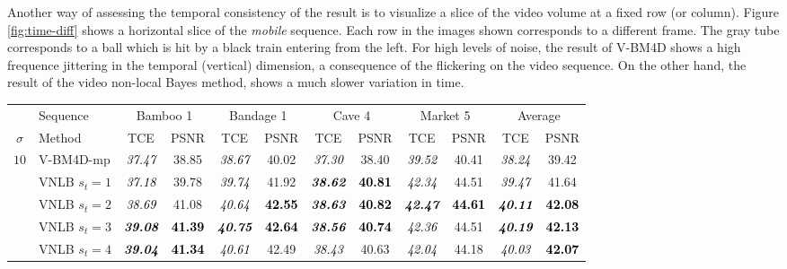 \documentclass[10pt, a4paper]{article}
\newcommand{\best}[1]{#1}
\newcommand{\bsic}[1]{\textcolor{black}{\textit{#1}}}
\newcommand{\Bsic}[1]{\textcolor{black}{\textbf{\textit{#1}}}}
\newcommand{\Best}[1]{\textbf{\textcolor{black}{#1}}}
\begin{document}
Another way of assessing the temporal consistency of the result is to visualize a 
slice of the video volume at a fixed row (or column). Figure \ref{fig:time-diff} shows
a horizontal slice of the \emph{mobile} sequence. Each row in the images shown corresponds
to a different frame. The gray tube corresponds to a ball which is hit by a
black train entering from the left. For high levels of noise, the result of V-BM4D
shows a high frequence jittering in the temporal (vertical) dimension, a consequence
of the flickering on the video sequence. On the other hand, the result of the
video non-local Bayes method, shows a much slower variation in time.


\begin{table}[htp!]
	\begin{center}
		{\small
		\renewcommand{\tabcolsep}{1.6mm}
		\renewcommand{\arraystretch}{1.3}
		\begin{tabular}{ c | l |c c | c c | c c | c c | c c}
			\hline
			\rule{0pt}{10pt}         & Sequence          &\multicolumn{2}{c|}{Bamboo 1}&\multicolumn{2}{c|}{Bandage 1}&\multicolumn{2}{c|}{Cave 4} &\multicolumn{2}{c|}{Market 5}& \multicolumn{2}{c}{Average} \\
			\rule{0pt}{10pt}$\sigma$ & Method            & TCE          & PSNR         & TCE          & PSNR         & TCE          & PSNR         & TCE          & PSNR         & TCE          & PSNR         \\\hline
			\multirow{1}{*}{$10$}
			                      & V-BM4D-mp            & \bsic{37.47} &       38.85  & \bsic{38.67} &       40.02  & \bsic{37.30} &       38.40  & \bsic{39.52} &       40.41  & \bsic{38.24} &       39.42  \\
			                      & VNLB   $s_t = 1$     & \bsic{37.18} &       39.78  & \bsic{39.74} &       41.92  & \Bsic{38.62} & \Best{40.81} & \bsic{42.34} & \best{44.51} & \bsic{39.47} &       41.64  \\
			                      & VNLB   $s_t = 2$     & \bsic{38.69} &       41.08  & \bsic{40.64} & \Best{42.55} & \Bsic{38.63} & \Best{40.82} & \Bsic{42.47} & \Best{44.61} & \Bsic{40.11} & \Best{42.08} \\
			                      & VNLB   $s_t = 3$     & \Bsic{39.08} & \Best{41.39} & \Bsic{40.75} & \Best{42.64} & \Bsic{38.56} & \Best{40.74} & \bsic{42.36} &       44.51  & \Bsic{40.19} & \Best{42.13} \\
			                      & VNLB   $s_t = 4$     & \Bsic{39.04} & \Best{41.34} & \bsic{40.61} & \best{42.49} & \bsic{38.43} &       40.63  & \bsic{42.04} &       44.18  & \bsic{40.03} & \Best{42.07} \\\hline

\end{tabular}}
\end{center}
\end{table}
\end{document}
